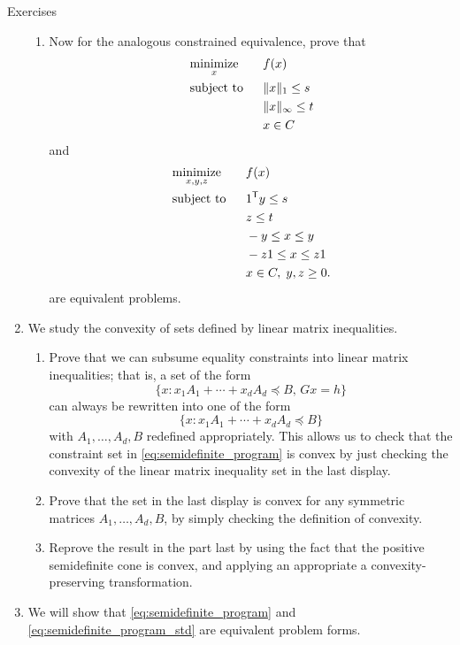 \begin{xcb}{Exercises}
\begin{enumerate}[label=\thechapter.\arabic*]
\begin{enumerate}[label=\alph*.]
\item Now for the analogous constrained equivalence, prove that
  \begin{alignat*}{2}
  &\operatorname*{minimize}_x \quad && f(x) \\ 
  &\operatorname{subject\,\,to} && \|x\|_1 \leq s \\
  & && \|x\|_\infty \leq t \\
  & && x \in C
  \end{alignat*}
  and 
  \begin{alignat*}{2}
  &\operatorname*{minimize}_{x,y,z} \quad && f(x) \\  
  &\operatorname{subject\,\,to} && 1^{\mathsf{T}} y \leq s \\
  & && z \leq t \\
  & && -y \leq x \leq y \\
  & && -z1 \leq x \leq z1 \\
  & && x \in C, \; y,z \geq 0.
  \end{alignat*}
  are equivalent problems.
\end{enumerate}

\item \label{ex:linear_matrix_ineq}
  We study the convexity of sets defined by linear matrix inequalities. 

\begin{enumerate}[label=\alph*.]
\item Prove that we can subsume equality constraints into linear matrix
  inequalities; that is, a set of the form   
  \[
  \{x : x_1A_1 + \cdots + x_d A_d \preceq B, \, Gx = h\}
  \]
  can always be rewritten into one of the form 
  \[
  \{x : x_1A_1 + \cdots + x_d A_d \preceq B\}
  \]
  with $A_1,\dots,A_d,B$ redefined appropriately. This allows us to check that
  the constraint set in \eqref{eq:semidefinite_program} is convex by just
  checking the convexity of the linear matrix inequality set in the last
  display.  

\item Prove that the set in the last display is convex for any symmetric
  matrices $A_1,\dots,A_d,B$, by simply checking the definition of convexity.  

\item Reprove the result in the part last by using the fact that the positive 
  semidefinite cone is convex, and applying an appropriate a 
  convexity-preserving transformation.  
\end{enumerate}

\item \label{ex:semidefinite_program_std} 
  We will show that \eqref{eq:semidefinite_program} and
  \eqref{eq:semidefinite_program_std} are equivalent problem forms. 


\end{enumerate}
\end{xcb}
